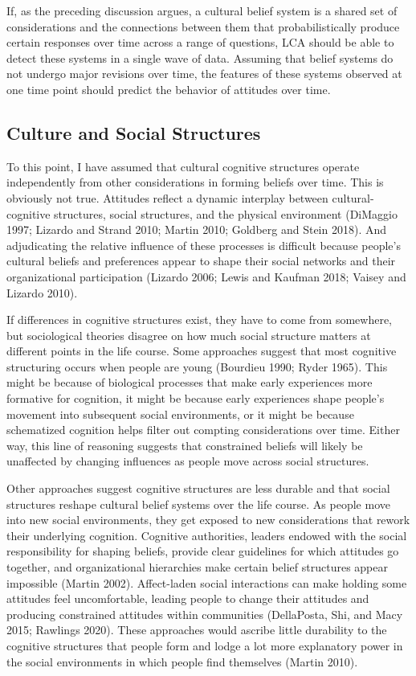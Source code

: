 \documentclass[12pt,]{article}
\begin{document}
If, as the preceding discussion argues, a cultural belief system is a shared set of considerations and the connections between them that probabilistically produce certain responses over time across a range of questions, LCA should be able to detect these systems in a single wave of data. Assuming that belief systems do not undergo major revisions over time, the features of these systems observed at one time point should predict the behavior of attitudes over time.

\hypertarget{culture-and-social-structures}{%
\subsection{Culture and Social Structures}\label{culture-and-social-structures}}

To this point, I have assumed that cultural cognitive structures operate independently from other considerations in forming beliefs over time. This is obviously not true. Attitudes reflect a dynamic interplay between cultural-cognitive structures, social structures, and the physical environment (DiMaggio 1997; Lizardo and Strand 2010; Martin 2010; Goldberg and Stein 2018). And adjudicating the relative influence of these processes is difficult because people's cultural beliefs and preferences appear to shape their social networks and their organizational participation (Lizardo 2006; Lewis and Kaufman 2018; Vaisey and Lizardo 2010).

If differences in cognitive structures exist, they have to come from somewhere, but sociological theories disagree on how much social structure matters at different points in the life course. Some approaches suggest that most cognitive structuring occurs when people are young (Bourdieu 1990; Ryder 1965). This might be because of biological processes that make early experiences more formative for cognition, it might be because early experiences shape people's movement into subsequent social environments, or it might be because schematized cognition helps filter out compting considerations over time. Either way, this line of reasoning suggests that constrained beliefs will likely be unaffected by changing influences as people move across social structures.

Other approaches suggest cognitive structures are less durable and that social structures reshape cultural belief systems over the life course. As people move into new social environments, they get exposed to new considerations that rework their underlying cognition. Cognitive authorities, leaders endowed with the social responsibility for shaping beliefs, provide clear guidelines for which attitudes go together, and organizational hierarchies make certain belief structures appear impossible (Martin 2002). Affect-laden social interactions can make holding some attitudes feel uncomfortable, leading people to change their attitudes and producing constrained attitudes within communities (DellaPosta, Shi, and Macy 2015; Rawlings 2020). These approaches would ascribe little durability to the cognitive structures that people form and lodge a lot more explanatory power in the social environments in which people find themselves (Martin 2010).
\end{document}

